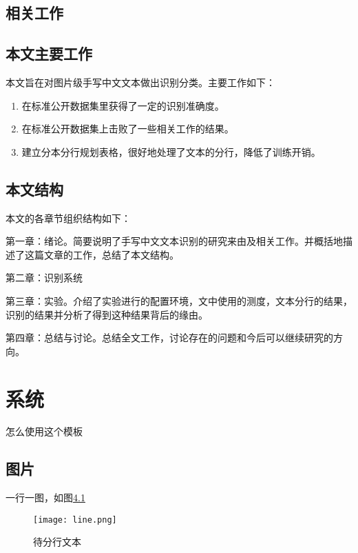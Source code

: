 \documentclass[winfonts]{njuthesis}
\begin{document}
\section{相关工作}


\section{本文主要工作}
本文旨在对图片级手写中文文本做出识别分类。主要工作如下：
\begin{enumerate}
\item 在标准公开数据集里获得了一定的识别准确度。

\item 在标准公开数据集上击败了一些相关工作的结果。

\item 建立分本分行规划表格，很好地处理了文本的分行，降低了训练开销。

\end{enumerate}
\section{本文结构}
本文的各章节组织结构如下：

第一章：绪论。简要说明了手写中文文本识别的研究来由及相关工作。并概括地描述了这篇文章的工作，总结了本文结构。

第二章：识别系统

第三章：实验。介绍了实验进行的配置环境，文中使用的测度，文本分行的结果，识别的结果并分析了得到这种结果背后的缘由。

第四章：总结与讨论。总结全文工作，讨论存在的问题和今后可以继续研究的方向。

\chapter{系统}\label{chapter_system}

怎么使用这个模板

\section{图片}

一行一图，如图\ref{fig:line}
\begin{figure}[htbp]
   \centering
   \texttt{[image: line.png]} %
   \caption{待分行文本}
   \label{fig:line}
\end{figure}
\end{document}
